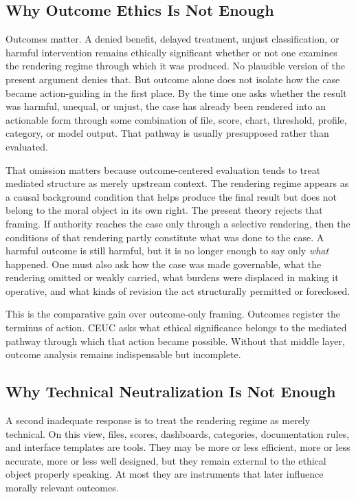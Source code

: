 \documentclass[11pt]{article}
\renewcommand{\emph}[1]{\textit{#1}}
\begin{document}
\subsection{Why Outcome Ethics Is Not Enough}

Outcomes matter. A denied benefit, delayed treatment, unjust classification, or harmful intervention remains ethically significant whether or not one examines the rendering regime through which it was produced. No plausible version of the present argument denies that. But outcome alone does not isolate how the case became action-guiding in the first place. By the time one asks whether the result was harmful, unequal, or unjust, the case has already been rendered into an actionable form through some combination of file, score, chart, threshold, profile, category, or model output. That pathway is usually presupposed rather than evaluated. \cite{MoynihanHerdHarvey2015AdministrativeBurden,Eubanks2018AutomatingInequality,Swanson2026MediatedJudgmentConstraint}

That omission matters because outcome-centered evaluation tends to treat mediated structure as merely upstream context. The rendering regime appears as a causal background condition that helps produce the final result but does not belong to the moral object in its own right. The present theory rejects that framing. If authority reaches the case only through a selective rendering, then the conditions of that rendering partly constitute what was done to the case. A harmful outcome is still harmful, but it is no longer enough to say only \emph{what} happened. One must also ask how the case was made governable, what the rendering omitted or weakly carried, what burdens were displaced in making it operative, and what kinds of revision the act structurally permitted or foreclosed.

This is the comparative gain over outcome-only framing. Outcomes register the terminus of action. CEUC asks what ethical significance belongs to the mediated pathway through which that action became possible. Without that middle layer, outcome analysis remains indispensable but incomplete.

\subsection{Why Technical Neutralization Is Not Enough}

A second inadequate response is to treat the rendering regime as merely technical. On this view, files, scores, dashboards, categories, documentation rules, and interface templates are tools. They may be more or less efficient, more or less accurate, more or less well designed, but they remain external to the ethical object properly speaking. At most they are instruments that later influence morally relevant outcomes.
\end{document}
